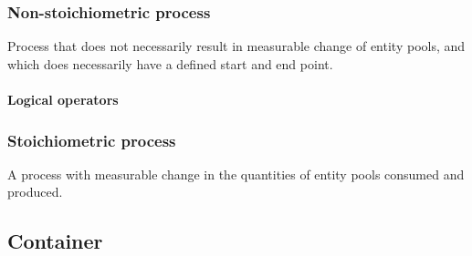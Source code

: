 \subsubsection{Non-stoichiometric process}

 Process that does not necessarily result in measurable change of entity pools, and which does necessarily have a defined start and end point. 






\paragraph{Logical operators}\label{sec:logic}





\subsubsection{Stoichiometric process}

A process with measurable change in the quantities of entity pools
consumed and produced. 









\subsection{Container}


